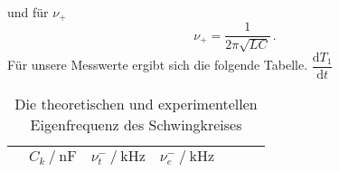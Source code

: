 und für $\nu_+$ 
\begin{equation*}
    \nu_+     =\dfrac{1}{2\pi \sqrt{LC}}\,.
\end{equation*}
Für unsere Messwerte ergibt sich die folgende Tabelle.
{$\dfrac{\text{d}T_1}{\text{d}t}$}
\begin{table}[H]
    \centering
    \begin{tabular}{S S S S S S S}
      \toprule
      & {$C_k \mathbin{/} \unit{\nano\farad}$} & {$\nu^-_t \mathbin{/} \unit{\kilo\hertz}$} & {$\nu^-_e \mathbin{/} \unit{\kilo\hertz}$}\\
      \midrule
      


      \bottomrule
    \end{tabular}
    \caption{Die theoretischen und experimentellen Eigenfrequenz des Schwingkreises}
  \end{table}